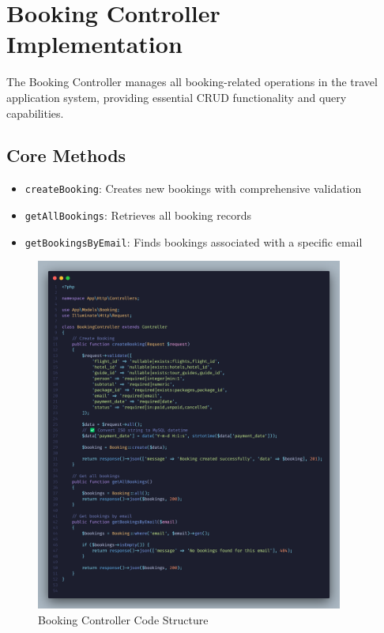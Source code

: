 \section{Booking Controller Implementation}

The Booking Controller manages all booking-related operations in the travel application system, providing essential CRUD functionality and query capabilities.

\subsection{Core Methods}
\begin{itemize}
    \item \texttt{createBooking}: Creates new bookings with comprehensive validation
    \item \texttt{getAllBookings}: Retrieves all booking records
    \item \texttt{getBookingsByEmail}: Finds bookings associated with a specific email
\end{itemize}

\begin{figure}[H]
    \centering
    \includegraphics[width=0.9\textwidth]{./figures/implementation/Booking_Controller.png}
    \caption{Booking Controller Code Structure}
    \label{fig:booking_controller}
\end{figure}

